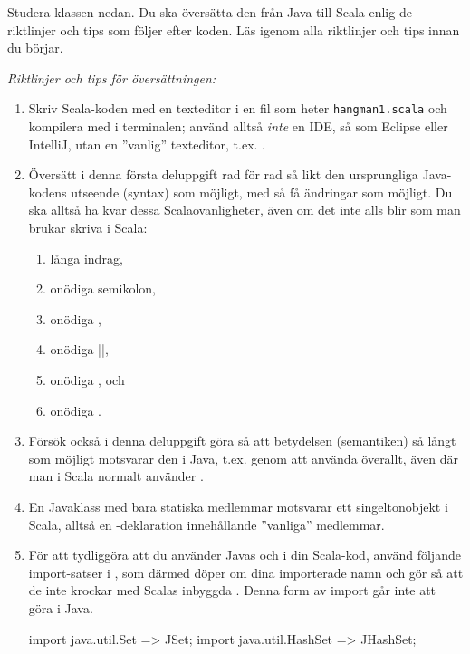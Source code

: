 \Subtask Studera klassen  nedan. Du ska översätta den från Java till Scala enlig de riktlinjer och tips som följer efter koden. Läs igenom alla riktlinjer och tips innan du börjar.


\noindent\emph{Riktlinjer och tips för översättningen:}

\begin{enumerate}[noitemsep]

\item Skriv Scala-koden med en texteditor i en fil som heter \texttt{hangman1.scala} och kompilera med  i terminalen; använd alltså \emph{inte} en IDE, så som Eclipse eller IntelliJ, utan en ''vanlig'' texteditor, t.ex. .

\item Översätt i denna första deluppgift rad för rad så likt den ursprungliga Java-kodens utseende (syntax)  som möjligt, med så få ändringar som möjligt. Du ska alltså ha kvar dessa Scalaovanligheter, även om det inte alls blir som man brukar skriva i Scala:
\begin{enumerate}
\item långa indrag, \item onödiga semikolon, \item onödiga \code{()}, \item onödiga \code|{}|, \item onödiga , och \item onödiga .
\end{enumerate}

\item Försök också i denna deluppgift göra så att betydelsen (semantiken) så långt som möjligt motsvarar den i Java, t.ex. genom att använda  överallt, även där man i Scala normalt använder .

\item En Javaklass med bara statiska medlemmar motsvarar ett singeltonobjekt i Scala, alltså en -deklaration innehållande ''vanliga'' medlemmar.

\item För att tydliggöra att du använder Javas  och  i din Scala-kod, använd följande import-satser i , som därmed döper om dina importerade namn och gör så att de inte krockar med Scalas inbyggda . Denna form av import går inte att göra i Java.
\begin{Code}
import java.util.{Set => JSet};
import java.util.{HashSet => JHashSet};
\end{Code}


\end{enumerate}
